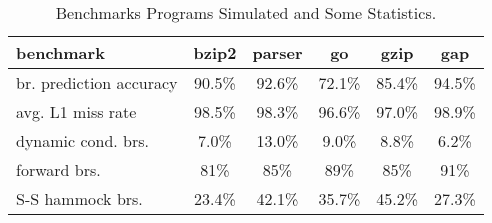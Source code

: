 \begin{table}
\begin{center}
\caption{Benchmarks Programs Simulated and Some Statistics.}
\label{tab:benches}
\begin{tabular}{|l|c|c|c|c|c|}
\hline 
benchmark&bzip2&parser&go&gzip&gap\\
\hline 
\hline 
br. prediction accuracy&90.5\%&92.6\%&72.1\%&85.4\%&94.5\%\\
\hline 
avg. L1 miss rate&98.5\%&98.3\%&96.6\%&97.0\%&98.9\%\\
\hline 
dynamic cond. brs.&7.0\%&13.0\%&9.0\%&8.8\%&6.2\%\\
\hline 
forward brs.&81\%&85\%&89\%&85\%&91\%\\
\hline 
S-S hammock brs.&23.4\%&42.1\%&35.7\%&45.2\%&27.3\%\\
\hline
\end{tabular}
\end{center}
\end{table}
